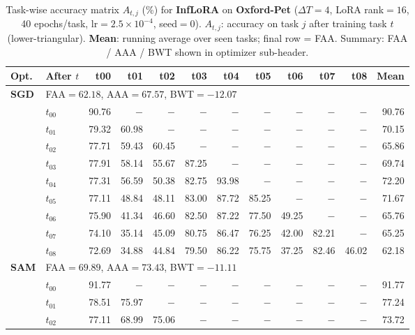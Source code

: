 \begin{table}[ht]
\centering
\caption{%
  Task-wise accuracy matrix $A_{t,j}$ (\%) for \textbf{InfLoRA} on \textbf{Oxford-Pet}
  ($\Delta T=4$, LoRA rank$=16$, 40 epochs/task, lr$=2.5\times10^{-4}$, seed$=0$).
  $A_{t,j}$: accuracy on task $j$ after training task $t$ (lower-triangular).
  \textbf{Mean}: running average over seen tasks; final row = FAA.
  Summary: FAA / AAA / BWT shown in optimizer sub-header.
}
\label{tab:raw_inflora_oxfordpet}
\setlength{\tabcolsep}{2.8pt}
\renewcommand{\arraystretch}{0.88}
\scriptsize
\begin{tabular}{@{}l l r r r r r r r r r r@{}}
\toprule
\textbf{Opt.} & \textbf{After $t$} & \textbf{t00} & \textbf{t01} & \textbf{t02} & \textbf{t03} & \textbf{t04} & \textbf{t05} & \textbf{t06} & \textbf{t07} & \textbf{t08} & \textbf{Mean} \\
\midrule
\multirow{10}{*}{\textbf{SGD}} & \multicolumn{11}{l}{\quad\small FAA$=62.18$,\; AAA$=67.57$,\; BWT$=-12.07$} \\
 & $t_{00}$ & 90.76 & $-$ & $-$ & $-$ & $-$ & $-$ & $-$ & $-$ & $-$ & 90.76 \\
 & $t_{01}$ & 79.32 & 60.98 & $-$ & $-$ & $-$ & $-$ & $-$ & $-$ & $-$ & 70.15 \\
 & $t_{02}$ & 77.71 & 59.43 & 60.45 & $-$ & $-$ & $-$ & $-$ & $-$ & $-$ & 65.86 \\
 & $t_{03}$ & 77.91 & 58.14 & 55.67 & 87.25 & $-$ & $-$ & $-$ & $-$ & $-$ & 69.74 \\
 & $t_{04}$ & 77.31 & 56.59 & 50.38 & 82.75 & 93.98 & $-$ & $-$ & $-$ & $-$ & 72.20 \\
 & $t_{05}$ & 77.11 & 48.84 & 48.11 & 83.00 & 87.72 & 85.25 & $-$ & $-$ & $-$ & 71.67 \\
 & $t_{06}$ & 75.90 & 41.34 & 46.60 & 82.50 & 87.22 & 77.50 & 49.25 & $-$ & $-$ & 65.76 \\
 & $t_{07}$ & 74.10 & 35.14 & 45.09 & 80.75 & 86.47 & 76.25 & 42.00 & 82.21 & $-$ & 65.25 \\
 & $t_{08}$ & 72.69 & 34.88 & 44.84 & 79.50 & 86.22 & 75.75 & 37.25 & 82.46 & 46.02 & 62.18 \\
\midrule
\multirow{10}{*}{\textbf{SAM}} & \multicolumn{11}{l}{\quad\small FAA$=69.89$,\; AAA$=73.43$,\; BWT$=-11.11$} \\
 & $t_{00}$ & 91.77 & $-$ & $-$ & $-$ & $-$ & $-$ & $-$ & $-$ & $-$ & 91.77 \\
 & $t_{01}$ & 78.51 & 75.97 & $-$ & $-$ & $-$ & $-$ & $-$ & $-$ & $-$ & 77.24 \\
 & $t_{02}$ & 77.11 & 68.99 & 75.06 & $-$ & $-$ & $-$ & $-$ & $-$ & $-$ & 73.72 \\

\end{tabular}
\end{table}
